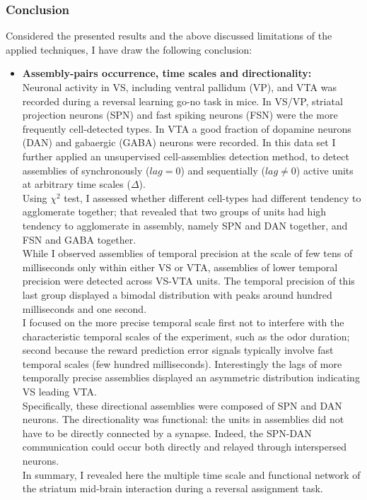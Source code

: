 \subsubsection{Conclusion}
Considered the presented results and the above discussed limitations of the applied techniques, I have draw the following conclusion:
\begin{itemize}
    \item \textbf{Assembly-pairs occurrence, time scales and directionality:}\\Neuronal activity in VS, including ventral pallidum (VP), and VTA was recorded during a reversal learning go-no task in mice. In VS/VP, striatal projection neurons (SPN) and fast spiking neurons (FSN) were the more frequently cell-detected types. In VTA a good fraction of dopamine neurons (DAN) and  gabaergic (GABA) neurons were recorded. In this data set I further applied an unsupervised cell-assemblies detection method, to detect assemblies of synchronously ($lag=0$) and sequentially ($lag\neq0$) active units at arbitrary time scales ($\Delta$).\\Using $\chi^2$ test, I assessed whether different cell-types had different tendency to agglomerate together; that revealed that two groups of units had high tendency to agglomerate in assembly, namely SPN and DAN together, and FSN and GABA together.\\While I observed assemblies of temporal precision at the scale of few tens of milliseconds only within either VS or VTA, assemblies of lower temporal precision were detected across VS-VTA units. The temporal precision of this last group displayed a bimodal distribution with peaks around hundred milliseconds and one second.\\I focused on the more precise temporal scale first not to interfere with the characteristic temporal scales of the experiment, such as the odor duration; second because the reward prediction error signals typically involve fast temporal scales (few hundred milliseconds). Interestingly the lags of more temporally precise assemblies displayed an asymmetric distribution indicating VS leading VTA.\\ Specifically, these directional assemblies were composed of SPN and DAN neurons. The directionality was functional: the units in assemblies did not have to be directly connected by a synapse. Indeed, the SPN-DAN communication could occur both directly and relayed through interspersed neurons.\\In summary, I revealed here the multiple time scale and functional network of the striatum mid-brain interaction during a reversal assignment task.  

\end{itemize}
